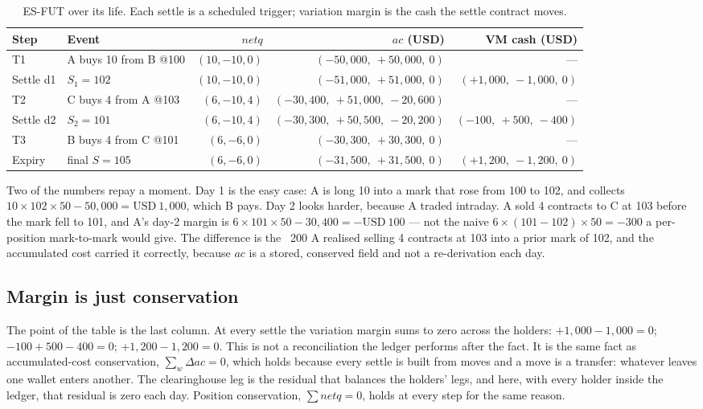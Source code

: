 \begin{table}[h]
\centering
\small
\begin{tabular}{@{}llrrr@{}}
\toprule
Step & Event & $\mathit{netq}$ & $ac$ (USD) & VM cash (USD) \\
\midrule
T1        & A buys 10 from B @100 & $(10,-10,0)$ & $(-50{,}000,\ +50{,}000,\ 0)$ & --- \\
Settle d1 & $S_1 = 102$           & $(10,-10,0)$ & $(-51{,}000,\ +51{,}000,\ 0)$ & $(+1{,}000,\ -1{,}000,\ 0)$ \\
T2        & C buys 4 from A @103  & $(6,-10,4)$  & $(-30{,}400,\ +51{,}000,\ -20{,}600)$ & --- \\
Settle d2 & $S_2 = 101$           & $(6,-10,4)$  & $(-30{,}300,\ +50{,}500,\ -20{,}200)$ & $(-100,\ +500,\ -400)$ \\
T3        & B buys 4 from C @101  & $(6,-6,0)$   & $(-30{,}300,\ +30{,}300,\ 0)$ & --- \\
Expiry    & final $S = 105$       & $(6,-6,0)$   & $(-31{,}500,\ +31{,}500,\ 0)$ & $(+1{,}200,\ -1{,}200,\ 0)$ \\
\bottomrule
\end{tabular}
\caption{ES-FUT over its life. Each settle is a scheduled trigger; variation margin is
the cash the settle contract moves.}
\label{tab:futures-life}
\end{table}

Two of the numbers repay a moment. Day 1 is the easy case: A is long 10 into a mark
that rose from 100 to 102, and collects $10 \times 102 \times 50 - 50{,}000 =
\text{USD}~1{,}000$, which B pays. Day 2 looks harder, because A traded intraday. A
sold 4 contracts to C at 103 before the mark fell to 101, and A's day-2 margin is
$6 \times 101 \times 50 - 30{,}400 = -\text{USD}~100$ --- not the naive
$6 \times (101 - 102) \times 50 = -300$ a per-position mark-to-mark would give. The
difference is the ~200 A realised selling 4 contracts at 103 into a prior
mark of 102, and the accumulated cost carried it correctly, because $ac$ is a stored,
conserved field and not a re-derivation each day.

\subsection{Margin is just conservation}

The point of the table is the last column. At every settle the variation margin sums
to zero across the holders: $+1{,}000 - 1{,}000 = 0$; $-100 + 500 - 400 = 0$;
$+1{,}200 - 1{,}200 = 0$. This is not a reconciliation the ledger performs after the
fact. It is the same fact as accumulated-cost conservation, $\sum_w \Delta ac = 0$,
which holds because every settle is built from moves and a move is a transfer:
whatever leaves one wallet enters another. The clearinghouse leg is the residual that
balances the holders' legs, and here, with every holder inside the ledger, that
residual is zero each day. Position conservation, $\sum \mathit{netq} = 0$, holds at
every step for the same reason.


